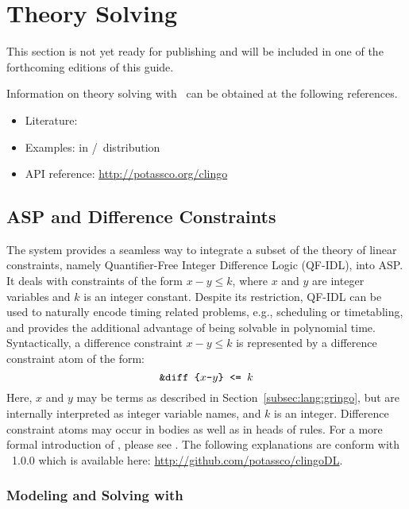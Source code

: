 \section{Theory Solving}\label{sec:theory}

This section is not yet ready for publishing
and will be included in one of the forthcoming editions of this guide.

Information on theory solving with \clingo\ can be obtained at the following references.

\begin{itemize}
\item Literature: \cite{gekakaosscwa16a,kascwa17a}
\item Examples:  in \gringo/\clingo\ distribution
\item API reference: \url{http://potassco.org/clingo}
\end{itemize}

\subsection{ASP and Difference Constraints}
\label{sec:difference:constraints}

The system  provides a seamless way to integrate a subset of the theory of linear constraints, namely Quantifier-Free Integer Difference Logic (QF-IDL), into ASP.
It deals with constraints of the form $x-y\leq k$, where $x$ and $y$ are integer variables and $k$ is an integer constant.
Despite its restriction, QF-IDL can be used to naturally encode timing related problems, e.g., scheduling or timetabling, and provides the additional advantage of being solvable in polynomial time.
Syntactically, a difference constraint $x-y\leq k$ is represented by a difference constraint atom of the form:
 \[
    \texttt{\&diff\text{ }\{$x$-$y$\}\text{ }<=\text{ }$k$}
 \]
Here, $x$ and $y$ may be terms as described in Section~\ref{subsec:lang:gringo}, but are internally interpreted as integer variable names,
and $k$ is an integer.
Difference constraint atoms may occur in bodies as well as in heads of rules.
For a more formal introduction of , please see \cite{jakaosscscwa17a}.
The following explanations are conform with ~1.0.0 which is available here: \url{http://github.com/potassco/clingoDL}.


\subsubsection{Modeling and Solving with }

